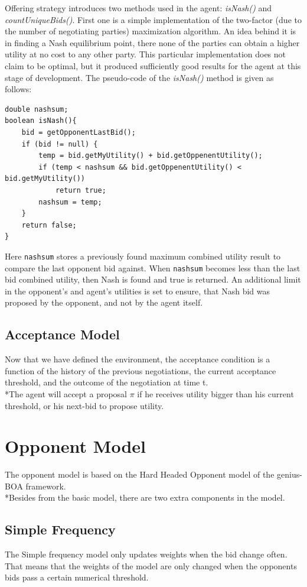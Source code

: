 \documentclass[html]{report}    %
\begin{document}
Offering strategy introduces two methods used in the agent: \textit{isNash()} and \textit{countUniqueBids()}. First one is a simple implementation of the two-factor (due to the number of negotiating parties) maximization algorithm. An idea behind it is in finding a Nash equilibrium point, there none of the parties can obtain a higher utility at no cost to any other party. This particular implementation does not claim to be optimal, but it produced sufficiently good results for the agent at this stage of development. The pseudo-code of the  \textit{isNash()} method is given as follows:

\begin{verbatim}
double nashsum;
boolean isNash(){
    bid = getOpponentLastBid();		
    if (bid != null) {
        temp = bid.getMyUtility() + bid.getOppenentUtility();
        if (temp < nashsum && bid.getOppenentUtility() < bid.getMyUtility())
            return true;			
        nashsum = temp;
    }		
    return false;
}
\end{verbatim}
Here \texttt{nashsum} stores a previously found maximum combined utility result to compare the last opponent bid against. When \texttt{nashsum} becomes less than the last bid combined utility, then Nash is found and true is returned. An additional limit in the opponent's and agent's utilities is set to ensure, that Nash bid was proposed by the opponent, and not by the agent itself.

\subsection{Acceptance Model}

Now that we have defined the environment, the acceptance condition is a function of the history of the previous negotiations, the current acceptance threshold, and the outcome of the negotiation at time t.
\\*The agent will accept a proposal $\pi$ if he receives utility bigger than his current threshold, or his next-bid to propose utility.


\section{Opponent Model}  

The opponent model is based on the Hard Headed Opponent model of the genius-BOA framework.
\\*Besides from the basic model, there are two extra components in the model.~\cite{anac2013}
\subsection{Simple Frequency}
The Simple frequency model only updates weights when the bid change often.
That means that the weights of the model are only changed when the opponents bids pass a certain numerical threshold.
\end{document}
